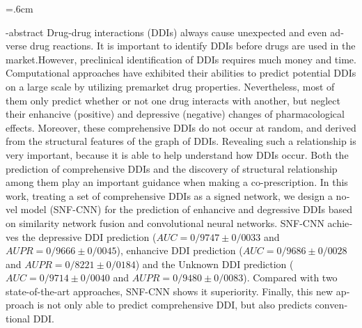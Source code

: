 \baselineskip=.6cm
\begin{latin}
\en-abstract{
\noindent
Drug-drug interactions (DDIs) always cause unexpected and even adverse drug reactions. It is important to identify DDIs before drugs are used in the market.However, preclinical identification of DDIs requires much money and time. Computational approaches have exhibited their abilities to predict potential DDIs on a large scale by utilizing premarket drug properties. Nevertheless, most of them only predict whether or not one drug interacts with another, but neglect their enhancive (positive) and depressive (negative) changes of pharmacological effects. Moreover, these comprehensive DDIs do not occur at random, and derived from the structural features of the graph of DDIs. Revealing such a relationship is very important, because it is able to help understand how DDIs occur. Both the prediction of comprehensive DDIs and the discovery of structural relationship among them play an important guidance when making a co-prescription.
\newline
In this work, treating a set of comprehensive DDIs as a signed network, we design a novel model (SNF-CNN) for the prediction of enhancive and degressive DDIs based on similarity network fusion and convolutional neural networks. SNF-CNN achieves the depressive DDI prediction ($AUC=0/9747 \pm 0/0033 $ and $AUPR=0/9666 \pm 0/0045 $), enhancive DDI prediction ($AUC=0/9686 \pm 0/0028$ and $AUPR=0/8221 \pm 0/0184$) and the Unknown DDI prediction ($AUC=0/9714 \pm 0/0040$ and $AUPR=0/9480 \pm 0/0083$). Compared with two state-of-the-art approaches, SNF-CNN shows it superiority. Finally, this new approach is not only able to predict comprehensive DDI, but also predicts conventional DDI.
}
\end{latin}
